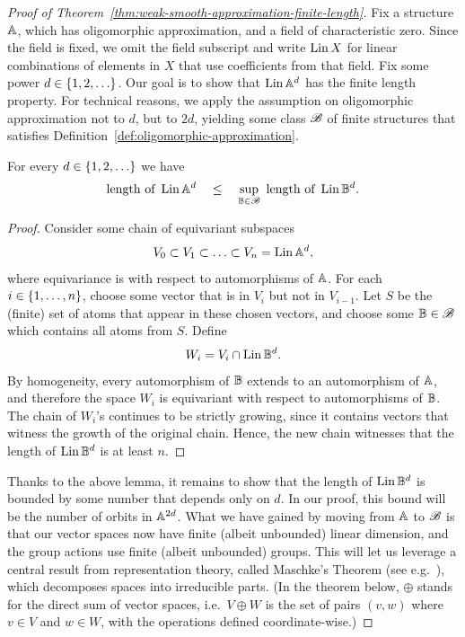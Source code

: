 \begin{proof}
    [Proof of Theorem~\ref{thm:weak-smooth-approximation-finite-length}]
Fix a structure $\mathbb{A}$, which has oligomorphic approximation, and  a field of characteristic zero. Since the field is fixed, we omit the field subscript and write $\operatorname{Lin} X$ for linear combinations of elements in $X$ that use coefficients from that field. Fix some power $d \in \{1,2,\ldots\}$.  Our goal is to show that 
$
\operatorname{Lin} \mathbb{A}^d
$
 has  the finite length property. For technical reasons, we apply the assumption on oligomorphic approximation not to $d$, but to $2d$, yielding  some class $\mathscr{B}$ of finite structures that satisfies Definition~\ref{def:oligomorphic-approximation}.


    \begin{lemma}\label{lem:reduce-to-finite-substructures}
        For every $d \in \{1,2,\ldots\}$ we have 
        \begin{align*}
        \text{length of }\operatorname{Lin} \mathbb{A}^d
        \quad \leq \quad  \sup_{\mathbb{B} \in \mathscr{B}} \text{\ length of }\operatorname{Lin} \mathbb{B}^d.
        \end{align*}
    \end{lemma}
    \begin{proof}
        Consider some chain of equivariant subspaces 
        \begin{align*}
        V_0 \subset V_1 \subset \ldots \subset V_n = \operatorname{Lin} \mathbb{A}^d,
        \end{align*}
        where equivariance is with respect to automorphisms of $\mathbb{A}$. 
        For each $i \in \{1,\ldots,n\}$, choose some vector  that is in $V_i$ but not in $V_{i-1}$. Let $S$ be the (finite) set of atoms that appear in these chosen vectors, and choose some $\mathbb{B} \in \mathscr{B}$ which contains all atoms from $S$. Define  
        \begin{align*}
        W_i = V_i \cap \operatorname{Lin} \mathbb{B}^d.
        \end{align*}
        By homogeneity, every automorphism of $\mathbb{B}$ extends to an automorphism of $\mathbb{A}$, and therefore the space $W_i$ is  equivariant with respect to automorphisms of $\mathbb{B}$.  The chain of $W_i$'s continues to be strictly growing, since it contains vectors that witness the growth of the original chain. Hence, the new chain  witnesses that the length of $\operatorname{Lin} \mathbb{B}^d$ is at least $n$. 
    \end{proof}


    Thanks to the above lemma, it remains to show that the length of $\operatorname{Lin} \mathbb{B}^d$ is bounded by some number that depends only on $d$. In our proof, this bound will be the number of orbits in $\mathbb{A}^{2d}$. What we have gained by moving from $\mathbb{A}$ to $\mathscr{B}$ is that our vector spaces now have finite (albeit unbounded) linear dimension, and the group actions use finite (albeit unbounded) groups. This will let us leverage a central result from representation theory, called Maschke's Theorem (see e.g.~\cite[Chap.~8]{JamesLiebeck01}), which decomposes  spaces  into irreducible parts.  (In the theorem below, $\oplus$ stands for the direct sum of vector spaces, i.e.~$V \oplus W$ is the set of pairs $(v,w)$ where $v \in V$ and $w \in W$, with the operations defined coordinate-wise.)


\end{proof}
